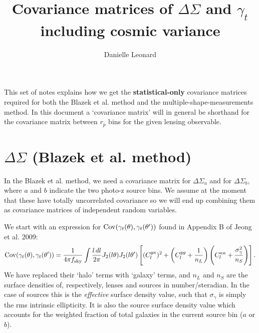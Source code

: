\documentclass[onecolumn,amsmath,aps,fleqn, superscriptaddress]{revtex4}
\begin{document}
\title{Covariance matrices of $\Delta \Sigma$ and $\gamma_t$ including cosmic variance}

\author{Danielle Leonard}

\maketitle
This set of notes explains how we get the {\bf statistical-only} covariance matrices required for both the Blazek et al. method and the multiple-shape-measurements method. In this document a `covariance matrix' will in general be shorthand for the covariance matrix between $r_p$ bins for the given lensing observable.
\section{$\Delta \Sigma$ (Blazek et al. method)}
In the Blazek et al. method, we need a covariance matrix for $\Delta\Sigma_a$ and for $\Delta\Sigma_b$, where $a$ and $b$ indicate the two photo-z source bins. We assume at the moment that these have totally uncorrelated covariance so we will end up combining them as covariance matrices of independent random variables.

We start with an expression for ${\rm Cov}(\gamma_t(\theta), \gamma_t(\theta^\prime))$ found in Appendix B of Jeong et al. 2009:
\begin{equation}
{\rm Cov}(\gamma_t(\theta), \gamma_t(\theta^\prime)) = \frac{1}{4\pi f_{\rm sky}} \int \frac{l \, dl}{2\pi} J_2(l \theta) J_2 (l \theta^\prime) \left[ (C_l^{g \kappa})^2 + \left(C_l^{gg} + \frac{1}{n_L}\right)\left(C_l^{\kappa \kappa} + \frac{\sigma_{\gamma}^2}{n_S}\right)\right].
\label{covgamgam}
\end{equation}
We have replaced their `halo' terms with `galaxy' terms, and $n_L$ and $n_S$ are the surface densities of, respectively, lenses and sources in number/steradian. In the case of sources this is the {\it effective} surface density value, such that $\sigma_\gamma$ is simply the rms intrinsic ellipticity. It is also the source surface density value which accounts for the weighted fraction of total galaxies in the current source bin ($a$ or $b$).
\end{document}

